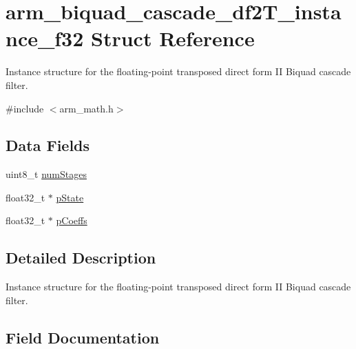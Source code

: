 \hypertarget{structarm__biquad__cascade__df2_t__instance__f32}{}\section{arm\+\_\+biquad\+\_\+cascade\+\_\+df2\+T\+\_\+instance\+\_\+f32 Struct Reference}
\label{structarm__biquad__cascade__df2_t__instance__f32}


Instance structure for the floating-\/point transposed direct form II Biquad cascade filter.  




{\ttfamily \#include $<$arm\+\_\+math.\+h$>$}

\subsection*{Data Fields}
\begin{DoxyCompactItemize}
\item 
uint8\+\_\+t \hyperlink{structarm__biquad__cascade__df2_t__instance__f32_a3615af038f56917909e0370c11bc2ec7}{num\+Stages}
\item 
float32\+\_\+t $\ast$ \hyperlink{structarm__biquad__cascade__df2_t__instance__f32_a335c87e6fdc4b96601d95a5de8b9c463}{p\+State}
\item 
float32\+\_\+t $\ast$ \hyperlink{structarm__biquad__cascade__df2_t__instance__f32_aacbb8dd8eeba4b21fc2bb40076405ee3}{p\+Coeffs}
\end{DoxyCompactItemize}


\subsection{Detailed Description}
Instance structure for the floating-\/point transposed direct form II Biquad cascade filter. 

\subsection{Field Documentation}
\mbox{\label{structarm__biquad__cascade__df2_t__instance__f32_a3615af038f56917909e0370c11bc2ec7}} 
